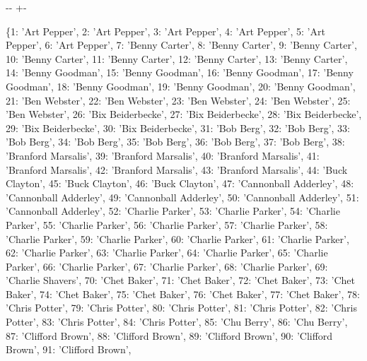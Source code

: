 \documentclass[letterpaper,10pt,english]{sphinxmanual}
\newlength\nbsphinxcodecellspacing
\begin{document}
{

\kern-\sphinxverbatimsmallskipamount\kern-\baselineskip
\kern+\FrameHeightAdjust\kern-\fboxrule
\vspace{\nbsphinxcodecellspacing}

\begin{sphinxVerbatim}[commandchars=\\\{\}]
\llap{\color{nbsphinxout}[26]:\,\hspace{\fboxrule}\hspace{\fboxsep}}\{1: 'Art Pepper',
 2: 'Art Pepper',
 3: 'Art Pepper',
 4: 'Art Pepper',
 5: 'Art Pepper',
 6: 'Art Pepper',
 7: 'Benny Carter',
 8: 'Benny Carter',
 9: 'Benny Carter',
 10: 'Benny Carter',
 11: 'Benny Carter',
 12: 'Benny Carter',
 13: 'Benny Carter',
 14: 'Benny Goodman',
 15: 'Benny Goodman',
 16: 'Benny Goodman',
 17: 'Benny Goodman',
 18: 'Benny Goodman',
 19: 'Benny Goodman',
 20: 'Benny Goodman',
 21: 'Ben Webster',
 22: 'Ben Webster',
 23: 'Ben Webster',
 24: 'Ben Webster',
 25: 'Ben Webster',
 26: 'Bix Beiderbecke',
 27: 'Bix Beiderbecke',
 28: 'Bix Beiderbecke',
 29: 'Bix Beiderbecke',
 30: 'Bix Beiderbecke',
 31: 'Bob Berg',
 32: 'Bob Berg',
 33: 'Bob Berg',
 34: 'Bob Berg',
 35: 'Bob Berg',
 36: 'Bob Berg',
 37: 'Bob Berg',
 38: 'Branford Marsalis',
 39: 'Branford Marsalis',
 40: 'Branford Marsalis',
 41: 'Branford Marsalis',
 42: 'Branford Marsalis',
 43: 'Branford Marsalis',
 44: 'Buck Clayton',
 45: 'Buck Clayton',
 46: 'Buck Clayton',
 47: 'Cannonball Adderley',
 48: 'Cannonball Adderley',
 49: 'Cannonball Adderley',
 50: 'Cannonball Adderley',
 51: 'Cannonball Adderley',
 52: 'Charlie Parker',
 53: 'Charlie Parker',
 54: 'Charlie Parker',
 55: 'Charlie Parker',
 56: 'Charlie Parker',
 57: 'Charlie Parker',
 58: 'Charlie Parker',
 59: 'Charlie Parker',
 60: 'Charlie Parker',
 61: 'Charlie Parker',
 62: 'Charlie Parker',
 63: 'Charlie Parker',
 64: 'Charlie Parker',
 65: 'Charlie Parker',
 66: 'Charlie Parker',
 67: 'Charlie Parker',
 68: 'Charlie Parker',
 69: 'Charlie Shavers',
 70: 'Chet Baker',
 71: 'Chet Baker',
 72: 'Chet Baker',
 73: 'Chet Baker',
 74: 'Chet Baker',
 75: 'Chet Baker',
 76: 'Chet Baker',
 77: 'Chet Baker',
 78: 'Chris Potter',
 79: 'Chris Potter',
 80: 'Chris Potter',
 81: 'Chris Potter',
 82: 'Chris Potter',
 83: 'Chris Potter',
 84: 'Chris Potter',
 85: 'Chu Berry',
 86: 'Chu Berry',
 87: 'Clifford Brown',
 88: 'Clifford Brown',
 89: 'Clifford Brown',
 90: 'Clifford Brown',
 91: 'Clifford Brown',

\end{sphinxVerbatim}}
\end{document}
